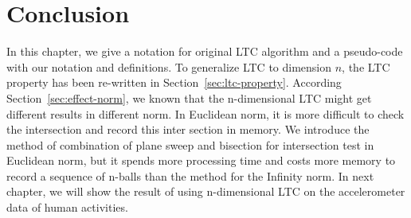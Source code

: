 \section{Conclusion}
In this chapter, we give a notation for original LTC algorithm and a pseudo-code
with our notation and definitions. To generalize LTC to dimension $n$, the LTC
property has been re-written in Section~\ref{sec:ltc-property}. According
Section~\ref{sec:effect-norm}, we known that the n-dimensional LTC might get
different results in different norm. In Euclidean norm, it is more difficult to
check the intersection and record this inter section in memory. We introduce the
method of combination of plane sweep and bisection for intersection test in
Euclidean norm, but it spends more processing time and costs more memory to
record a sequence of n-balls than the method for the Infinity norm. In next
chapter, we will show the result of using n-dimensional LTC on the accelerometer
data of human activities.  
